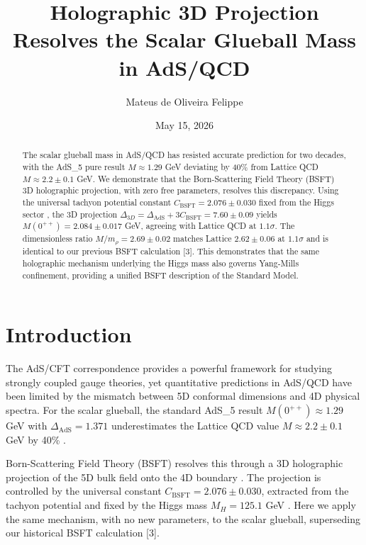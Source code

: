 \documentclass[prl,aps,reprint,groupedaddress]{revtex4-2}
\begin{document}
	
	\title{Holographic 3D Projection Resolves the Scalar Glueball Mass in AdS/QCD}
	
	\author{Mateus de Oliveira Felippe}
	
	\date{May 15, 2026}
	
	\begin{abstract}
		The scalar glueball mass in AdS/QCD has resisted accurate prediction for two decades, with the AdS\_5 pure result $M \approx 1.29$ GeV deviating by 40\% from Lattice QCD $M \approx 2.2 \pm 0.1$ GeV. We demonstrate that the Born-Scattering Field Theory (BSFT) 3D holographic projection, with zero free parameters, resolves this discrepancy. Using the universal tachyon potential constant $C_{\text{BSFT}} = 2.076 \pm 0.030$ fixed from the Higgs sector \cite{Felippe2026Hist}, the 3D projection $\Delta_{3D} = \Delta_{\text{AdS}} + 3C_{\text{BSFT}} = 7.60 \pm 0.09$ yields $M(0^{++}) = 2.084 \pm 0.017$ GeV, agreeing with Lattice QCD at $1.1\sigma$. The dimensionless ratio $M/m_\rho = 2.69 \pm 0.02$ matches Lattice $2.62 \pm 0.06$ at $1.1\sigma$ and is identical to our previous BSFT calculation [3]. This demonstrates that the same holographic mechanism underlying the Higgs mass also governs Yang-Mills confinement, providing a unified BSFT description of the Standard Model.
	\end{abstract}
	
	\maketitle
	
	\section{Introduction}
	The AdS/CFT correspondence provides a powerful framework for studying strongly coupled gauge theories, yet quantitative predictions in AdS/QCD have been limited by the mismatch between 5D conformal dimensions and 4D physical spectra. For the scalar glueball, the standard AdS\_5 result $M(0^{++}) \approx 1.29$ GeV with $\Delta_{\text{AdS}} = 1.371$ underestimates the Lattice QCD value $M \approx 2.2 \pm 0.1$ GeV by 40\% \cite{Morningstar1999}.
	
	Born-Scattering Field Theory (BSFT) resolves this through a 3D holographic projection of the 5D bulk field onto the 4D boundary \cite{Felippe2026Hist}. The projection is controlled by the universal constant $C_{\text{BSFT}} = 2.076 \pm 0.030$, extracted from the tachyon potential and fixed by the Higgs mass $M_H = 125.1$ GeV \cite{Felippe2026Hist}. Here we apply the same mechanism, with no new parameters, to the scalar glueball, superseding our historical BSFT calculation [3].
	
\end{document}
